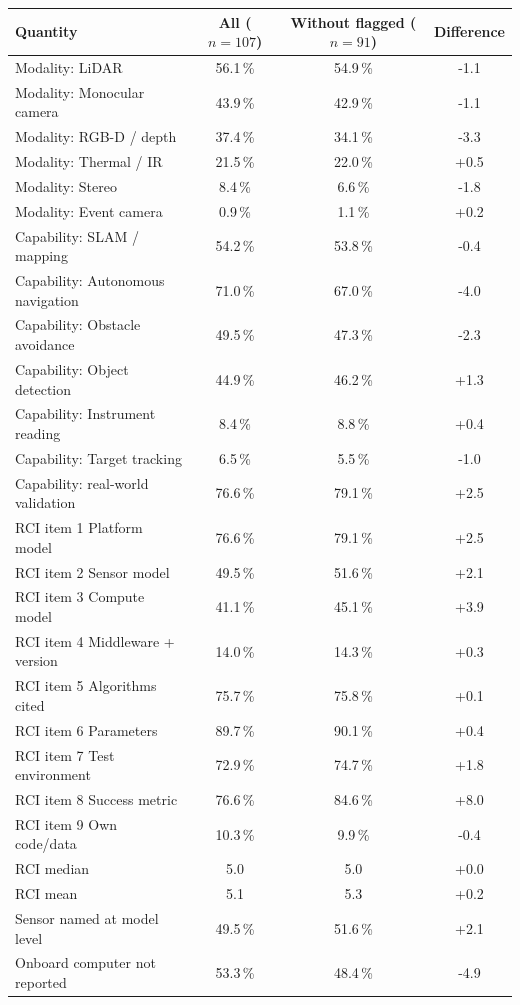 \begin{tabularx}{\textwidth}{XCCC}
\toprule
\textbf{Quantity} & \textbf{All ($n=107$)} & \textbf{Without flagged ($n=91$)} & \textbf{Difference}\\
\midrule
Modality: LiDAR & 56.1\,\% & 54.9\,\% & -1.1\\
Modality: Monocular camera & 43.9\,\% & 42.9\,\% & -1.1\\
Modality: RGB-D / depth & 37.4\,\% & 34.1\,\% & -3.3\\
Modality: Thermal / IR & 21.5\,\% & 22.0\,\% & +0.5\\
Modality: Stereo & 8.4\,\% & 6.6\,\% & -1.8\\
Modality: Event camera & 0.9\,\% & 1.1\,\% & +0.2\\
Capability: SLAM / mapping & 54.2\,\% & 53.8\,\% & -0.4\\
Capability: Autonomous navigation & 71.0\,\% & 67.0\,\% & -4.0\\
Capability: Obstacle avoidance & 49.5\,\% & 47.3\,\% & -2.3\\
Capability: Object detection & 44.9\,\% & 46.2\,\% & +1.3\\
Capability: Instrument reading & 8.4\,\% & 8.8\,\% & +0.4\\
Capability: Target tracking & 6.5\,\% & 5.5\,\% & -1.0\\
Capability: real-world validation & 76.6\,\% & 79.1\,\% & +2.5\\
RCI item 1 Platform model & 76.6\,\% & 79.1\,\% & +2.5\\
RCI item 2 Sensor model & 49.5\,\% & 51.6\,\% & +2.1\\
RCI item 3 Compute model & 41.1\,\% & 45.1\,\% & +3.9\\
RCI item 4 Middleware + version & 14.0\,\% & 14.3\,\% & +0.3\\
RCI item 5 Algorithms cited & 75.7\,\% & 75.8\,\% & +0.1\\
RCI item 6 Parameters & 89.7\,\% & 90.1\,\% & +0.4\\
RCI item 7 Test environment & 72.9\,\% & 74.7\,\% & +1.8\\
RCI item 8 Success metric & 76.6\,\% & 84.6\,\% & +8.0\\
RCI item 9 Own code/data & 10.3\,\% & 9.9\,\% & -0.4\\
RCI median & 5.0 & 5.0 & +0.0\\
RCI mean & 5.1 & 5.3 & +0.2\\
Sensor named at model level & 49.5\,\% & 51.6\,\% & +2.1\\
Onboard computer not reported & 53.3\,\% & 48.4\,\% & -4.9\\
\bottomrule
\end{tabularx}
